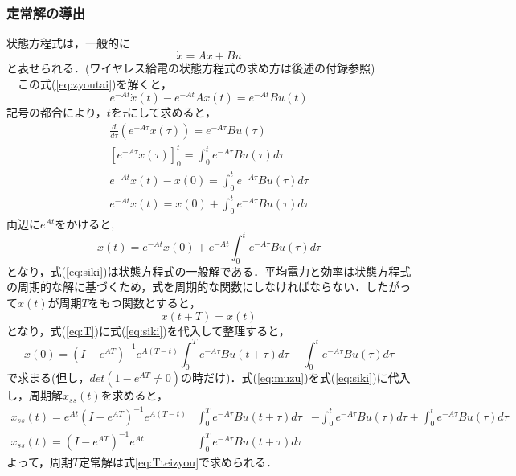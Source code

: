 \documentclass[12pt]{jarticle}
\begin{document}
\subsubsection{定常解の導出}
状態方程式は，一般的に
\begin{equation}
\label{eq:zyoutai}
\dot{x}=Ax+Bu
\end{equation}
と表せられる．(ワイヤレス給電の状態方程式の求め方は後述の付録参照)
\\　この式(\ref{eq:zyoutai})を解くと，
\begin{equation}
e^{-At}\dot{x}(t)-e^{-At}Ax(t)=e^{-At}Bu(t)
\end{equation}
記号の都合により，$tを\tau$にして求めると，
\begin{eqnarray}
\frac{d}{d\tau}(e^{-A\tau}x(\tau))=e^{-A\tau}Bu(\tau)\\
\left[e^{-A\tau}x(\tau)\right]^t_0=\int_{0}^{t}e^{-A\tau}Bu(\tau)d\tau\\
e^{-At}x(t)-x(0)=\int_{0}^{t}e^{-A\tau}Bu(\tau)d\tau\nonumber\\
e^{-At}x(t)=x(0)+\int_{0}^{t}e^{-A\tau}Bu(\tau)d\tau
\end{eqnarray}
$両辺にe^{At}をかけると,$
\begin{equation}
\label{eq:siki}
x(t)=e^{-At}x(0)+e^{-At}\int_{0}^{t}e^{-A\tau}Bu(\tau)d\tau
\end{equation}
となり，式(\ref{eq:siki})は状態方程式の一般解である．平均電力と効率は状態方程式の周期的な解に基づくため，式を周期的な関数にしなければならない．したがって$x(t)が周期Tをもつ関数とすると，$
\begin{equation}
\label{eq:T}
x(t+T)=x(t)
\end{equation}
となり，式(\ref{eq:T})に式(\ref{eq:siki})を代入して整理すると，
\begin{equation}
\label{eq:muzu}
x(0)=(I-e^{AT})^{-1}e^{A(T-t)}\int_{0}^{T}e^{-A\tau}Bu(t+\tau)d\tau-\int_{0}^{t}e^{-A\tau}Bu(\tau)d\tau
\end{equation}
で求まる(但し，$det(1-e^{AT}\neq0)$の時だけ)．式(\ref{eq:muzu})を式(\ref{eq:siki})に代入し，周期解$x_{ss}(t)$を求めると，
\begin{eqnarray}
x_{ss}(t)=e^{At}(I-e^{AT})^{-1}e^{A(T-t)}&\int_{0}^{T}e^{-A\tau}Bu(t+\tau)d\tau&-\int_{0}^{t}e^{-A\tau}Bu(\tau)d\tau+\int_{0}^{t}e^{-A\tau}Bu(\tau)d\tau\nonumber
\\x_{ss}(t)=(I-e^{AT})^{-1}e^{At}&\int_{0}^{T}e^{-A\tau}Bu(t+\tau)d\tau&
\label{eq:Tteizyou}
\end{eqnarray}
よって，周期$T$定常解は式\ref{eq:Tteizyou}で求められる．
\end{document}
